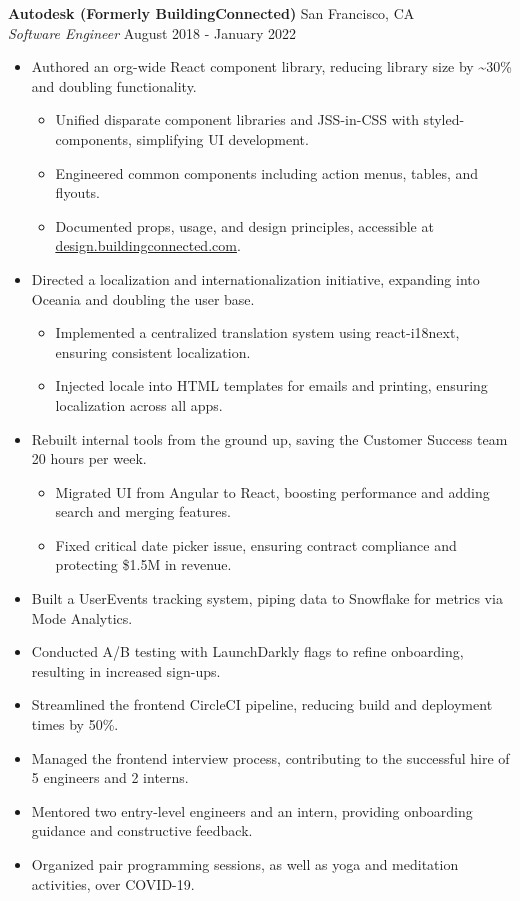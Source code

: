 \documentclass[a4paper]{article}
\begin{document}
\textbf{Autodesk (Formerly BuildingConnected)} \hfill San Francisco, CA\\
\textit{Software Engineer} \hfill August 2018 - January 2022\\
\vspace{-1mm}
\begin{itemize} \itemsep .5pt
    \item Authored an org-wide React component library, reducing library size by \textasciitilde{}30\% and doubling functionality.
    \begin{itemize} \itemsep .5pt
        \item Unified disparate component libraries and JSS-in-CSS with styled-components, simplifying UI development.
        \item Engineered common components including action menus, tables, and flyouts.
        \item Documented props, usage, and design principles, accessible at \href{https://design.buildingconnected.com/}{\underline{design.buildingconnected.com}}.
    \end{itemize}
    \item Directed a localization and internationalization initiative, expanding into Oceania and doubling the user base.
    \begin{itemize} \itemsep .5pt
        \item Implemented a centralized translation system using react-i18next, ensuring consistent localization.
        \item Injected locale into HTML templates for emails and printing, ensuring localization across all apps.
    \end{itemize}
    \item Rebuilt internal tools from the ground up, saving the Customer Success team 20 hours per week.
    \begin{itemize} \itemsep .5pt
        \item Migrated UI from Angular to React, boosting performance and adding search and merging features.
        \item Fixed critical date picker issue, ensuring contract compliance and protecting \$1.5M in revenue.
    \end{itemize}
    \item Built a UserEvents tracking system, piping data to Snowflake for metrics via Mode Analytics.
    \item Conducted A/B testing with LaunchDarkly flags to refine onboarding, resulting in increased sign-ups.
    \item Streamlined the frontend CircleCI pipeline, reducing build and deployment times by 50\%.
    \item Managed the frontend interview process, contributing to the successful hire of 5 engineers and 2 interns.
    \item Mentored two entry-level engineers and an intern, providing onboarding guidance and constructive feedback.
    \item Organized pair programming sessions, as well as yoga and meditation activities, over COVID-19.
\end{itemize}
\end{document}
